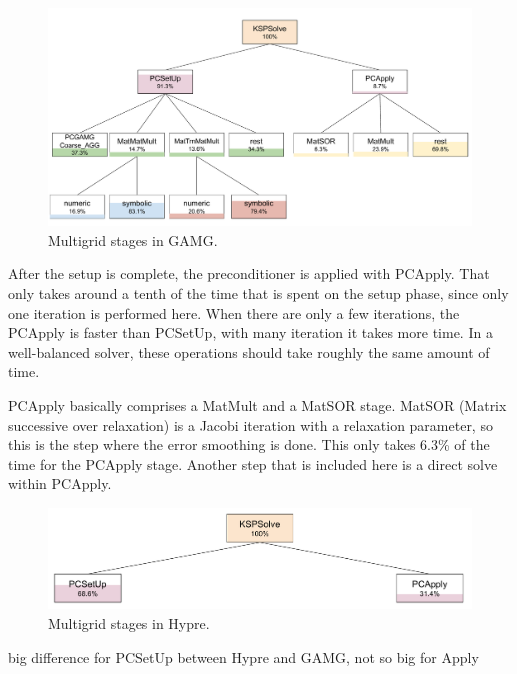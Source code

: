 \begin{figure}[tbp]
	\centering
	\hspace*{-5mm}\includegraphics[width=1.1\textwidth]{Multigrid_hierarchy_GAMG}
	\caption{Multigrid stages in GAMG.} 
	\label{fig:multigrid_hierarchy_gamg}
\end{figure}

After the setup is complete, the preconditioner is applied with PCApply. That only takes around a tenth of the time that is spent on the setup phase, since only one iteration is performed here. When there are only a few iterations, the PCApply is faster than PCSetUp, with many iteration it takes more time. In a well-balanced solver, these operations should take roughly the same amount of time. 

PCApply basically comprises a MatMult and a MatSOR stage. MatSOR (Matrix successive over relaxation) is a Jacobi iteration with a relaxation parameter, so this is the step where the error smoothing is done. This only takes 6.3\% of the time for the PCApply stage. Another step that is included here is a direct solve within PCApply.

\begin{figure}[tbp]
	\centering
	\hspace*{-5mm}\includegraphics[width=1.\textwidth]{Multigrid_hierarchy_Hypre}
	\caption{Multigrid stages in Hypre.} 
	\label{fig:multigrid_hierarchy_hypre}
\end{figure}

big difference for PCSetUp between Hypre and GAMG, not so big for Apply





